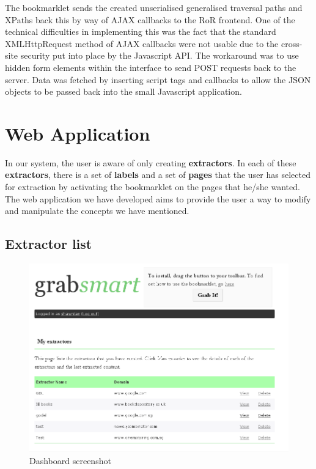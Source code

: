 The bookmarklet sends the created unserialised generalised traversal paths and XPaths back this
by way of AJAX callbacks to the RoR frontend. One of the technical difficulties in implementing
this was the fact that the standard XMLHttpRequest method of AJAX callbacks were not usable due
to the cross-site security put into place by the Javascript API. The workaround was to use
hidden form elements within the interface to send POST requests back to the server. Data was
fetched by inserting script tags and callbacks to allow the JSON objects to be passed back into
the small Javascript application.

\section{Web Application}
 In our system, the user is aware of only creating \textbf{extractors}. In each of these
 \textbf{extractors}, there is a set of \textbf{labels} and a set of \textbf{pages} that the
 user has selected for extraction by activating the bookmarklet on the pages that he/she
 wanted. The web application we have developed aims to provide the user a way to modify and
 manipulate the concepts we have mentioned.
 
 \subsection{Extractor list}
\begin{figure}[htbp]
\centering
\includegraphics[scale=0.43]{dashboard.png} 
\caption{Dashboard screenshot}
\label{fig:dashboard}
\end{figure}

